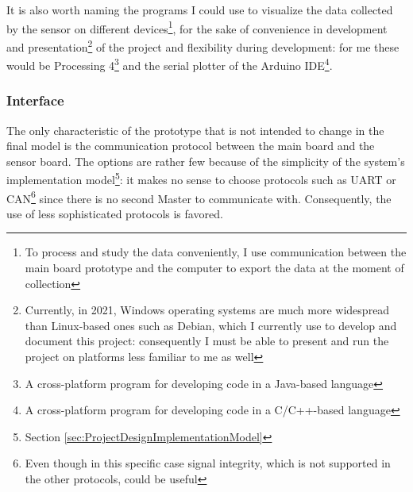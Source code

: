\documentclass[a4paper, 10pt, final]{article} %
\begin{document}
    
    It is also worth naming the programs I could use to visualize the data collected by the sensor on different devices\footnote{To process and study the data conveniently, I use communication between the main board prototype and the computer to export the data at the moment of collection}, for the sake of convenience in development and presentation\footnote{Currently, in 2021, Windows operating systems are much more widespread than Linux-based ones such as Debian, which I currently use to develop and document this project: consequently I must be able to present and run the project on platforms less familiar to me as well} of the project and flexibility during development: for me these would be Processing 4\footnote{A cross-platform program for developing code in a Java-based language} and the serial plotter of the Arduino IDE\footnote{A cross-platform program for developing code in a C/C++-based language}.

    \subsubsection{Interface}\label{sec:MotherboardDesignInterface}
    The only characteristic of the prototype that is not intended to change in the final model is the communication protocol between the main board and the sensor board.
    The options are rather few because of the simplicity of the system's implementation model\footnote{Section \ref{sec:ProjectDesignImplementationModel}}: it makes no sense to choose protocols such as UART or CAN\footnote{Even though in this specific case signal integrity, which is not supported in the other protocols, could be useful} since there is no second Master to communicate with.
    Consequently, the use of less sophisticated protocols is favored.
\end{document}
